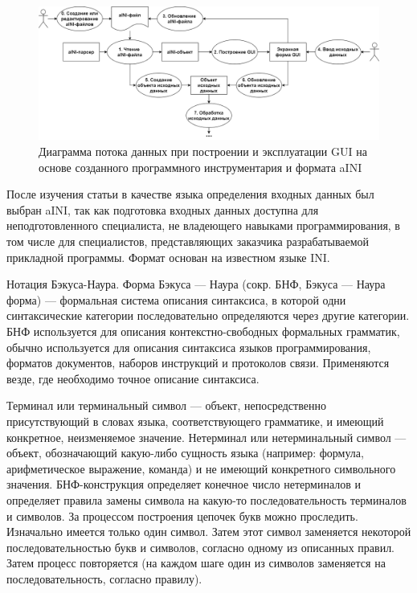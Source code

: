 \begin{figure}[!ht]
  \centering
  \includegraphics[scale=0.35]{ResearchNotes/rndhpc_not_gui_2022_09_29/diagram.png}
  \caption{Диаграмма потока данных при построении и эксплуатации GUI на основе созданного программного инструментария и формата aINI}
  \label{diagram}
\end{figure}

	После изучения статьи в качестве языка определения входных данных был выбран aINI, так как подготовка входных данных доступна для неподготовленного специалиста, не владеющего навыками программирования, в том числе для специалистов, представляющих заказчика разрабатываемой прикладной программы. Формат основан на известном языке INI.

	Нотация Бэкуса-Наура. Форма Бэкуса — Наура (сокр. БНФ, Бэкуса — Наура форма) — формальная система описания синтаксиса, в которой одни синтаксические категории последовательно определяются через другие категории. БНФ используется для описания контекстно-свободных формальных грамматик, обычно используется для описания синтаксиса языков программирования, форматов документов, наборов инструкций и протоколов связи. Применяются везде, где необходимо точное описание синтаксиса.

	Терминал или терминальный символ — объект, непосредственно присутствующий в словах языка, соответствующего грамматике, и имеющий конкретное, неизменяемое значение. Нетерминал или нетерминальный символ — объект, обозначающий какую-либо сущность языка (например: формула, арифметическое выражение, команда) и не имеющий конкретного символьного значения. БНФ-конструкция определяет конечное число нетерминалов и определяет правила замены символа на какую-то последовательность терминалов и символов. За процессом построения цепочек букв можно проследить. Изначально имеется только один символ. Затем этот символ заменяется некоторой последовательностью букв и символов, согласно одному из описанных правил. Затем процесс повторяется (на каждом шаге один из символов заменяется на последовательность, согласно правилу).
\noteattributes{}


